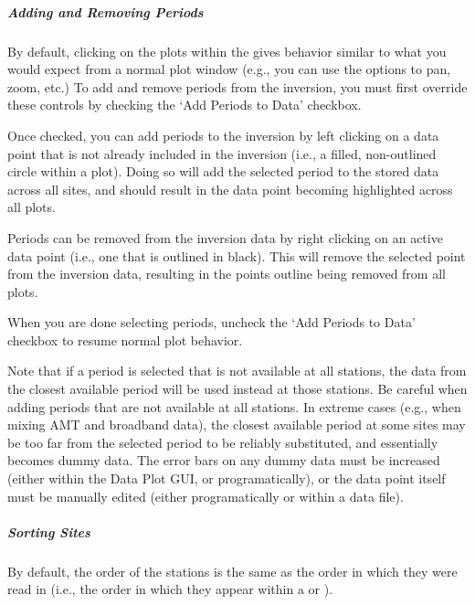 \documentclass[letterpaper,10pt,english]{sphinxmanual}
\begin{document}
\subparagraph{Adding and Removing Periods}
\label{\detokenize{content/data_plot/main_window:adding-and-removing-periods}}
By default, clicking on the plots within the {\hyperref[\detokenize{content/data_plot/main_window:plot-window}]{}} gives behavior similar to what you would expect from a normal plot window (e.g., you can use the {\hyperref[\detokenize{content/data_plot/main_window:toolbar}]{}} options to pan, zoom, etc.)
To add and remove periods from the inversion, you must first override these controls by checking the ‘Add Periods to Data’ checkbox.

Once checked, you can add periods to the inversion by left clicking on a data point that is not already included in the inversion (i.e., a filled, non-outlined circle within a plot). Doing so will add the selected period to the stored data across all sites, and should result in the data point becoming highlighted across all plots.

Periods can be removed from the inversion data by right clicking on an active data point (i.e., one that is outlined in black). This will remove the selected point from the inversion data, resulting in the points outline being removed from all plots.

When you are done selecting periods, uncheck the ‘Add Periods to Data’ checkbox to resume normal plot behavior.

Note that if a period is selected that is not available at all stations, the data from the closest available period will be used instead at those stations. Be careful when adding periods that are not available at all stations. In extreme cases (e.g., when mixing AMT and broadband data), the closest available period at some sites may be too far from the selected period to be reliably substituted, and essentially becomes dummy data. The error bars on any dummy data must be increased (either within the Data Plot GUI, or programatically), or the data point itself must be manually edited (either programatically or within a data file).


\subparagraph{Sorting Sites}
\label{\detokenize{content/data_plot/main_window:sorting-sites}}
By default, the order of the stations is the same as the order in which they were read in (i.e., the order in which they appear within a {\hyperref[\detokenize{content/api_core/input_files:list-file}]{}} or {\hyperref[\detokenize{content/api_core/input_files:data-file}]{}}).
\end{document}
